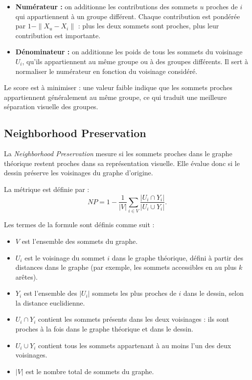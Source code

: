 \documentclass[a4paper,11pt]{article}
\begin{document}
\begin{itemize}
    \item \textbf{Numérateur :} on additionne les contributions des sommets $u$ proches de $i$ qui appartiennent à un groupe différent. Chaque contribution est pondérée par $1-\|X_u-X_i\|$ : plus les deux sommets sont proches, plus leur contribution est importante.
    \item \textbf{Dénominateur :} on additionne les poids de tous les sommets du voisinage $U_i$, qu'ils appartiennent au même groupe ou à des groupes différents. Il sert à normaliser le numérateur en fonction du voisinage considéré.
\end{itemize}

Le score est à minimiser : une valeur faible indique que les sommets proches appartiennent généralement au même groupe, ce qui traduit une meilleure séparation visuelle des groupes.

\subsection{Neighborhood Preservation}

La \textit{Neighborhood Preservation} mesure si les sommets proches dans le graphe théorique restent proches dans sa représentation visuelle. Elle évalue donc si le dessin préserve les voisinages du graphe d'origine.

La métrique est définie par :
\[
NP = 1-\frac{1}{|V|}
\sum_{i\in V}
\frac{|U_i\cap Y_i|}{|U_i\cup Y_i|}.
\]

Les termes de la formule sont définis comme suit :
\begin{itemize}
    \item $V$ est l'ensemble des sommets du graphe.
    \item $U_i$ est le voisinage du sommet $i$ dans le graphe théorique, défini à partir des distances dans le graphe (par exemple, les sommets accessibles en au plus $k$ arêtes).
    \item $Y_i$ est l'ensemble des $|U_i|$ sommets les plus proches de $i$ dans le dessin, selon la distance euclidienne.
    \item $U_i\cap Y_i$ contient les sommets présents dans les deux voisinages : ils sont proches à la fois dans le graphe théorique et dans le dessin.
    \item $U_i\cup Y_i$ contient tous les sommets appartenant à au moins l'un des deux voisinages.
    \item $|V|$ est le nombre total de sommets du graphe.
\end{itemize}
\end{document}
